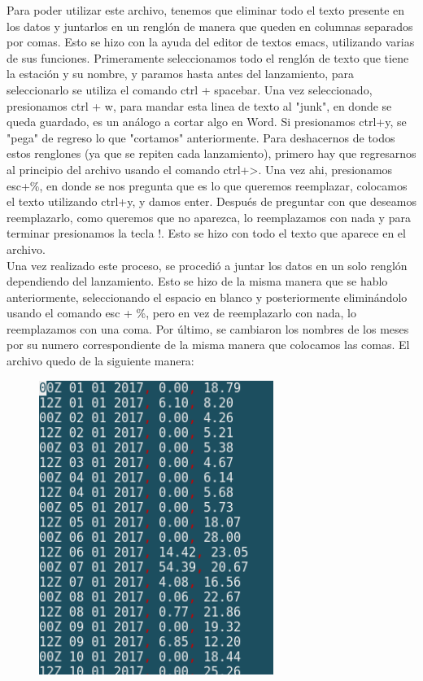 \documentclass[12pt]{article}
\begin{document}
Para poder utilizar este archivo, tenemos que eliminar todo el texto presente en los datos y juntarlos en un renglón de manera que queden en columnas separados por comas. Esto se hizo con la ayuda del editor de textos emacs, utilizando varias de sus funciones. Primeramente seleccionamos todo el renglón de texto que tiene la estación y su nombre, y paramos hasta antes del lanzamiento, para seleccionarlo se utiliza el comando ctrl + spacebar. Una vez seleccionado, presionamos ctrl + w, para mandar esta linea de texto al "junk", en donde se queda guardado, es un análogo a cortar algo en Word. Si presionamos ctrl+y, se "pega" de regreso lo que "cortamos" anteriormente. Para deshacernos de todos estos renglones (ya que se repiten cada lanzamiento), primero hay que regresarnos al principio del archivo usando el comando ctrl+>. Una vez ahi, presionamos esc+\%, en donde se nos pregunta que es lo que queremos reemplazar, colocamos el texto utilizando ctrl+y, y damos enter. Después de preguntar con que deseamos reemplazarlo, como queremos que no aparezca, lo reemplazamos con nada y para terminar presionamos la tecla !. Esto se hizo con todo el texto que aparece en el archivo. \\

Una vez realizado este proceso, se procedió a juntar los datos en un solo renglón dependiendo del lanzamiento. Esto se hizo de la misma manera que se hablo anteriormente, seleccionando el espacio en blanco y posteriormente eliminándolo usando el comando esc + \%, pero en vez de reemplazarlo con nada, lo reemplazamos con una coma. Por último, se cambiaron los nombres de los meses por su numero correspondiente de la misma manera que colocamos las comas. El archivo quedo de la siguiente manera: 

\begin{figure}[h]
    \centering
\includegraphics[width=3in]{2archivo.png}
\end{figure}
\end{document}
